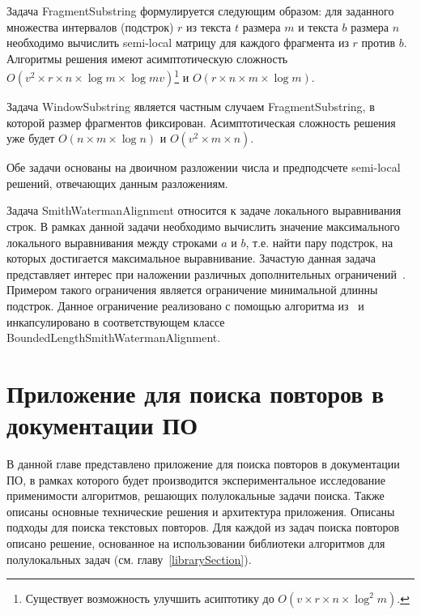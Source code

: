Задача FragmentSubstring формулируется следующим образом: для заданного множества интервалов (подстрок) $r$ из текста $t$ размера $m$ и текста $b$ размера $n$ необходимо вычислить semi-local матрицу для каждого фрагмента из $r$ против $b$.
Алгоритмы решения имеют асимптотическую сложность $O(v^2 \times r \times  n \times \log m \times \log mv)$\footnote{Существует возможность улучшить асиптотику до $O(v \times r \times  n \times \log^{2} m)$.} и $O(r \times n \times m  \times \log m)$.

Задача WindowSubstring является частным случаем  FragmentSubstring, в которой размер фрагментов фиксирован.
Асимптотическая сложность решения уже будет $O(n \times m \times \log n)$ и $O(v^2 \times  m \times n)$.

Обе задачи основаны на двоичном разложении числа и предподсчете semi-local решений, отвечающих данным разложениям.

Задача SmithWatermanAlignment относится к задаче локального выравнивания строк.
В рамках данной задачи необходимо вычислить значение максимального локального выравнивания между строками $a$ и $b$, т.е. найти пару подстрок, на которых достигается максимальное выравнивание.
Зачастую данная задача представляет интерес при наложении различных дополнительных ограничений~\cite{arslan2004dynamic}.
Примером такого ограничения является ограничение минимальной длинны подстрок.
Данное ограничение реализовано с помощью алгоритма из~\cite{tiskin2019bounded} и инкапсулировано в соответствующем классе BoundedLengthSmithWatermanAlignment.




\section{Приложение для поиска повторов в документации ПО}\label{searchPO}
В данной главе представлено приложение для поиска повторов в документации ПО, в рамках которого будет производится экспериментальное исследование применимости алгоритмов, решающих полулокальные задачи поиска.
Также описаны основные технические решения и архитектура приложения.
Описаны подходы для поиска текстовых повторов.
Для каждой из задач поиска повторов описано решение, основанное на использовании библиотеки алгоритмов для полулокальных задач (см. главу~\ref{librarySection}).

